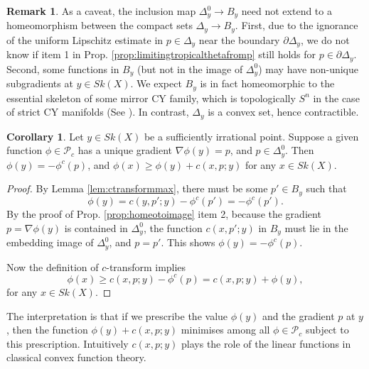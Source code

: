 \documentclass[a4paper]{article}
\theoremstyle{definition}
\newtheorem{cor}[thm]{Corollary}
\newtheorem{rmk}[thm]{Remark}
\begin{document}
	
	
		
	\begin{rmk}
		As a caveat, the inclusion map $\Delta_y^0\to B_y$ need not extend to a homeomorphism between the compact sets $\Delta_y\to B_y$. First, due to the ignorance of the uniform Lipschitz estimate in $p\in \Delta_y$ near the boundary $\partial \Delta_y$, we do not know if item 1 in Prop. \ref{prop:limitingtropicalthetafromp} still holds for $p\in \partial \Delta_y$. Second, some functions in $B_y$ (but not in the image of $\Delta_y^0$) may have non-unique subgradients at  $y\in Sk(X)$. We expect $B_y$ is in fact homeomorphic to the essential skeleton of some mirror CY family, which is topologically $S^n$ in the case of strict CY manifolds (See \cite[Sections 5,6]{Litheta}). In contrast, $\Delta_y$ is a convex set, hence contractible.
	\end{rmk}

	

	
	
	
	
	
	\begin{cor}
 Let $y\in Sk(X)$ be a sufficiently irrational point. Suppose a given function $\phi \in \mathcal{P}_c$ has a unique gradient  $\nabla \phi(y)=p$, and $p\in \Delta_y^0$. Then 
 $\phi(y)=  -\phi^c(p)$, and $\phi(x)\geq \phi(y)+ c(x,p;y)$ for any $x\in Sk(X)$.
	
	

	\end{cor}
	

	
	\begin{proof}
	By Lemma \ref{lem:ctransformmax}, there must be some  $p'\in B_y$ such that \[
	\phi(y)= c(y,p'; y)- \phi^c(p')= -\phi^c(p').\] By the proof of Prop. \ref{prop:homeotoimage} item 2,  because the gradient $p=\nabla \phi(y)$ is contained in $\Delta_y^0$, the function $c(x,p';y)$ in $B_y$ must lie in the embedding image of $\Delta_y^0$, and $p=p'$. This shows $\phi(y)= -\phi^c(p)$. 
	
	Now the definition of $c$-transform implies
	\[
	\phi(x)\geq c(x,p;y)- \phi^c(p)= c(x,p;y) + \phi(y),
	\]
for any $x\in Sk(X)$.
	\end{proof}
	
	
	
	The interpretation is that if we prescribe the value $\phi(y)$ and the gradient $p$ at $y$, then the function $ \phi(y)+ c(x,p;y)$ minimises among all $\phi\in \mathcal{P}_c$ subject to this prescription. Intuitively $c(x,p;y)$ plays the role of the linear functions in classical convex function theory.
	
\end{document}

